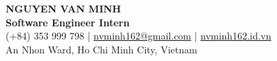 \begin{center}
    {\fontsize{25}{28}\selectfont\bfseries NGUYEN VAN MINH}\\[4pt]
    {\large\bfseries Software Engineer Intern}\\[6pt]
    (+84) 353 999 798 \;|\; \href{mailto:nvminh162@gmail.com}{nvminh162@gmail.com} \;|\; \href{https://nvminh162.id.vn}{nvminh162.id.vn}\\[3pt]
    An Nhon Ward, Ho Chi Minh City, Vietnam
    \\ \vspace{-1pt}
\end{center}
